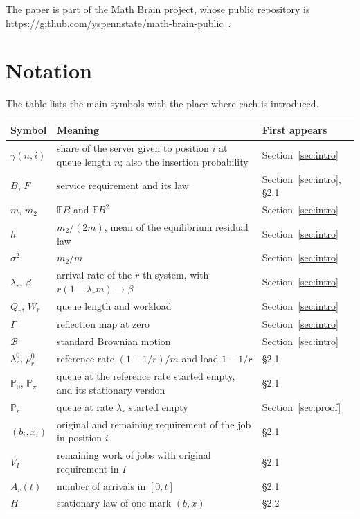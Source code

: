 \documentclass[11pt]{amsart}
\theoremstyle{remark}
\numberwithin{equation}{section}
\newcommand{\E}{\mathbb E}
\newcommand{\Pp}{\mathbb P}
\newcommand{\1}{\mathbf 1}
\begin{document}
The paper is part of the Math Brain project, whose public repository is \url{https://github.com/yspennstate/math-brain-public}~\cite{MathBrainRepo}.

\appendix
\section{Notation}\label{app:notation}
The table lists the main symbols with the place where each is introduced.

\medskip
\noindent
\begin{tabular}{@{}p{}p{}p{}@{}}
Symbol & Meaning & First appears\\\hline
$\gamma(n,i)$ & share of the server given to position $i$ at queue length $n$; also the insertion probability & Section~\ref{sec:intro}\\
$B$, $F$ & service requirement and its law & Section~\ref{sec:intro}, \S2.1\\
$m$, $m_2$ & $\E B$ and $\E B^2$ & Section~\ref{sec:intro}\\
$h$ & $m_2/(2m)$, mean of the equilibrium residual law & Section~\ref{sec:intro}\\
$\sigma^2$ & $m_2/m$ & Section~\ref{sec:intro}\\
$\lambda_r$, $\beta$ & arrival rate of the $r$-th system, with $r(1-\lambda_rm)\to\beta$ & Section~\ref{sec:intro}\\
$Q_r$, $W_r$ & queue length and workload & Section~\ref{sec:intro}\\
$\Gamma$ & reflection map at zero & Section~\ref{sec:intro}\\
$\mathcal B$ & standard Brownian motion & Section~\ref{sec:intro}\\
$\lambda^0_r$, $\rho^0_r$ & reference rate $(1-1/r)/m$ and load $1-1/r$ & \S2.1\\
$\Pp_0$, $\Pp_\pi$ & queue at the reference rate started empty, and its stationary version & \S2.1\\
$\Pp_r$ & queue at rate $\lambda_r$ started empty & Section~\ref{sec:proof}\\
$(b_i,x_i)$ & original and remaining requirement of the job in position $i$ & \S2.1\\
$V_I$ & remaining work of jobs with original requirement in $I$ & \S2.1\\
$A_r(t)$ & number of arrivals in $[0,t]$ & \S2.1\\
$H$ & stationary law of one mark $(b,x)$ & \S2.2\\

\end{tabular}
\end{document}
